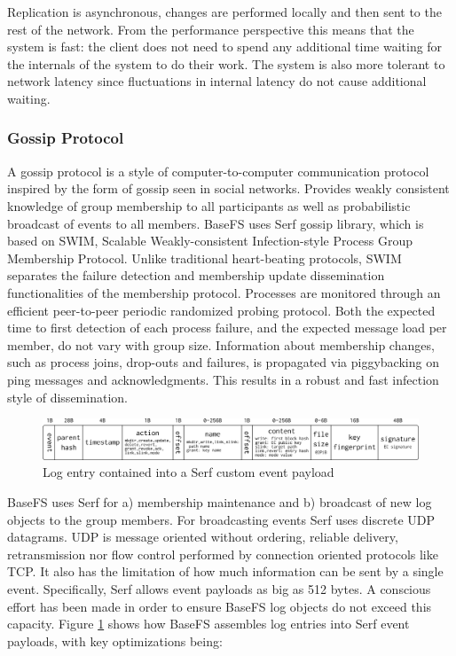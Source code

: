 \documentclass{sig-alternate}
\begin{document}
Replication is asynchronous, changes are performed locally and then sent to the rest of the network. From the performance perspective this means that the system is fast: the client does not need to spend any additional time waiting for the internals of the system to do their work. The system is also more tolerant to network latency since fluctuations in internal latency do not cause additional waiting. 



\subsubsection{Gossip Protocol}\label{gossip-protocol}

A gossip protocol is a style of computer-to-computer communication protocol inspired by the form of gossip seen in social networks. Provides weakly consistent knowledge of group membership to all participants as well as probabilistic broadcast of events to all members. BaseFS uses Serf gossip library, which is based on SWIM, Scalable Weakly-consistent Infection-style Process Group Membership Protocol\cite{SWIM}. Unlike traditional heart-beating protocols, SWIM separates the failure detection and membership update dissemination functionalities of the membership protocol. Processes are monitored through an efficient peer-to-peer periodic randomized probing protocol. Both the expected time to first detection of each process failure, and the expected message load per member, do not vary with group size. Information about membership changes, such as process joins, drop-outs and failures, is propagated via piggybacking on ping messages and acknowledgments. This results in a robust and fast infection style of dissemination. 


\begin{figure}
\centering
\includegraphics[width=\textwidth]{imgs/payload.png}
\caption{Log entry contained into a Serf custom event payload}
\label{fig:payload}
\end{figure}

BaseFS uses Serf for a) membership maintenance and b) broadcast of new log objects to the group members. For broadcasting events Serf uses discrete UDP datagrams. UDP is message oriented without ordering, reliable delivery, retransmission nor flow control performed by connection oriented protocols like TCP. It also has the limitation of how much information can be sent by a single event. Specifically, Serf allows event payloads as big as 512 bytes. A conscious effort has been made in order to ensure BaseFS log objects do not exceed this capacity. Figure \ref{fig:payload} shows how BaseFS assembles log entries into Serf event payloads, with key optimizations being:
\end{document}

